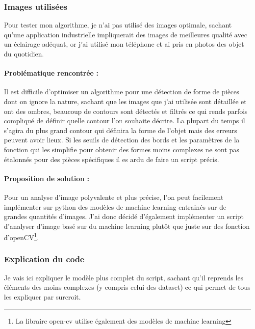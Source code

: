 	\subsubsection{Images utilisées}
	Pour tester mon algorithme, je n'ai pas utilisé des images optimale, sachant qu'une application industrielle impliquerait des images de meilleures qualité avec un éclairage adéquat, or j'ai utilisé mon téléphone et ai pris en photos des objet du quotidien.
	
	\paragraph{Problématique rencontrée : } Il est difficile d'optimiser un algorithme pour une détection de forme de pièces dont on ignore la nature, sachant que les images que j'ai utilisée sont détaillée et ont des ombres, beaucoup de contours sont détectés et filtrés ce qui rends parfois compliqué de définir quelle contour l'on souhaite décrire. La plupart du temps il s'agira du plus grand contour qui définira la forme de l'objet mais des erreurs peuvent avoir lieux. Si les seuils de détection des bords et les paramètres de la fonction qui les simplifie pour obtenir des formes moins complexes ne sont pas étalonnés pour des pièces spécifiques il es ardu de faire un script précis.
	
	\paragraph{Proposition de solution :} Pour un analyse d'image polyvalente et plus précise, l'on peut facilement implémenter sur python des modèles de machine learning entrainés sur de grandes quantités d'images. J'ai donc décidé d'également implémenter un script d'analyser d'image basé sur du machine learning plutôt que juste sur des fonction d'openCV\footnote{La libraire open-cv utilise également des modèles de machine learning}.
	
	\subsubsection{Explication du code}
	Je vais ici expliquer le modèle plus complet du script, sachant qu'il reprends les éléments des moins complexes (y-compris celui des dataset) ce qui permet de tous les expliquer par surcroit.
	
	\clearpage
	
